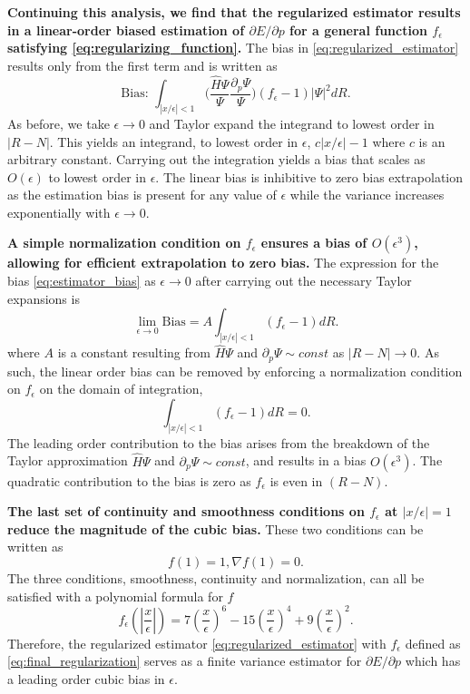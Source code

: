 \documentclass{article}
\begin{document}
\textbf{Continuing this analysis, we find that the regularized estimator results in a linear-order biased estimation of $\partial E/\partial p$ for a general function $f_\epsilon$ satisfying \eqref{eq:regularizing_function}.}
The bias in \eqref{eq:regularized_estimator} results only from the first term and is written as 
\begin{equation}
\text{Bias: } \int_{|x/\epsilon|< 1} \Big(\frac{\hat{H}\Psi}{\Psi}\frac{\partial_p\Psi}{\Psi}\Big) (f_\epsilon - 1)|\Psi|^2 dR.
\label{eq:estimator_bias}
\end{equation}
As before, we take $\epsilon \rightarrow 0$ and Taylor expand the integrand to lowest order in $|R-N|$.
This yields an integrand, to lowest order in $\epsilon$, $c|x/\epsilon| - 1$ where $c$ is an arbitrary constant.
Carrying out the integration yields a bias that scales as $O(\epsilon)$ to lowest order in $\epsilon$.
The linear bias is inhibitive to zero bias extrapolation as the estimation bias is present for any value of $\epsilon$ while the variance increases exponentially with $\epsilon \rightarrow 0$.

\textbf{A simple normalization condition on $f_\epsilon$ ensures a bias of $O(\epsilon^3)$, allowing for efficient extrapolation to zero bias.}
The expression for the bias \eqref{eq:estimator_bias} as $\epsilon \rightarrow 0$ after carrying out the necessary Taylor expansions is
$$
\lim_{\epsilon\rightarrow 0}\text{Bias} =  A \int_{|x/\epsilon|< 1} (f_\epsilon - 1) dR.
$$
where $A$ is a constant resulting from $\hat{H}\Psi$ and $\partial_p \Psi \sim const$ as $|R-N|\rightarrow 0$.
As such, the linear order bias can be removed by enforcing a normalization condition on $f_\epsilon$ on the domain of integration, 
\begin{equation}
\int_{|x/\epsilon|< 1} (f_\epsilon - 1) dR = 0.
\label{eq:normalization_condition}
\end{equation}
The leading order contribution to the bias arises from the breakdown of the Taylor approximation $\hat{H}\Psi$ and $\partial_p \Psi \sim const$, and results in a bias $O(\epsilon^3)$.
The quadratic contribution to the bias is zero as $f_\epsilon$ is even in $(R-N)$.

\textbf{The last set of continuity and smoothness conditions on $f_\epsilon$ at $|x/\epsilon| = 1$ reduce the magnitude of the cubic bias.}
These two conditions can be written as 
\begin{equation}
f(1) = 1, \nabla f(1) = 0.
\label{eq:smoothness_condition}
\end{equation}
The three conditions, smoothness, continuity and normalization, can all be satisfied with a polynomial formula for $f$
\begin{equation}
f_\epsilon(|\frac{x}{\epsilon}|) = 7(\frac{x}{\epsilon})^6 - 15(\frac{x}{\epsilon})^4 + 9(\frac{x}{\epsilon})^2.
\label{eq:final_regularization}
\end{equation}
Therefore, the regularized estimator \eqref{eq:regularized_estimator} with $f_\epsilon$ defined as \eqref{eq:final_regularization} serves as a finite variance estimator for $\partial E/\partial p$ which has a leading order cubic bias in $\epsilon$.
\end{document}
